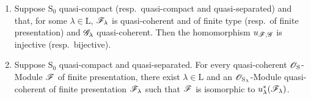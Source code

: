 \begin{theorem}[8.5.2]
\label{IV.8.5.2}
\begin{enumerate}[label=\textup{(\roman*)}]
  \item Suppose $\mathrm{S}_0$ quasi-compact (\textup{resp.}\ quasi-compact and quasi-separated) and that, for some $\lambda\in\mathrm{L}$, $\mathscr{F}_\lambda$ is quasi-coherent and of finite type (\textup{resp.}\ of finite presentation) and $\mathscr{G}_\lambda$ quasi-coherent.
Then the homomorphism $u_{\mathscr{F},\mathscr{G}}$ is injective (\textup{resp.}\ bijective).
  \item Suppose $\mathrm{S}_0$ quasi-compact and quasi-separated.
For every quasi-coherent $\mathscr{O}_\mathrm{S}$-Module $\mathscr{F}$ of finite presentation, there exist $\lambda\in\mathrm{L}$ and an $\mathscr{O}_{\mathrm{S}_\lambda}$-Module quasi-coherent of finite presentation $\mathscr{F}_\lambda$ such that $\mathscr{F}$ is isomorphic to $u_\lambda^*(\mathscr{F}_\lambda)$.
\end{enumerate}
\end{theorem}

